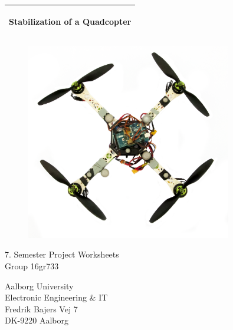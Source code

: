 %
\begin{titlepage}
  \addtolength{\hoffset}{0.5\evensidemargin-0.5\oddsidemargin} %
  \noindent%
  \begin{tabular}{@{}p{\textwidth}@{}}
    \toprule[2pt]
    \midrule
    \vspace{0.2cm}
    \begin{center}
    \Huge{\textbf{
      Stabilization of a Quadcopter %
    }}
    \end{center}
    \begin{center}
      \Large{

      }
    \end{center}
    \vspace{0.2cm}\\
    \midrule
    \toprule[2pt]
  \end{tabular}
   \vspace{0.55 cm}
  \begin{figure}[!ht]
\centering
\includegraphics[width=0.8\textwidth]{figures/quadcopter}
\label{fig:forside}
\end{figure}
  \vspace{0.6 cm}
  \begin{center}
    {\large
      7. Semester Project Worksheets %
    }\\
    \vspace{0.2cm}
    {\Large
      Group 16gr733%
    }
  \end{center}
  \begin{center}
  Aalborg University\\
  Electronic Engineering \& IT\\
  Fredrik Bajers Vej 7\\
  DK-9220 Aalborg
  \end{center}
\end{titlepage}

\clearpage